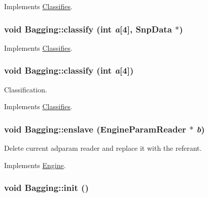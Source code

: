 Implements \hyperlink{classClassifies_a5e3d218b44024ec2c3ab3398e3dbd2e3}{Classifies}.

\hypertarget{classBagging_a9b17e15983996f8ae3b39564e7c3deba}{
\subsubsection[{classify}]{\setlength{\rightskip}{0pt plus 5cm}void Bagging::classify (int {\em a}\mbox{[}4\mbox{]}, \/  {\bf SnpData} $\ast$)}}
\label{classBagging_a9b17e15983996f8ae3b39564e7c3deba}


Implements \hyperlink{classClassifies_a7d2ae89f04af1a74eb6dd35be8eda476}{Classifies}.

\hypertarget{classBagging_a02227120bc610a21f39f2454ac03ec7b}{
\subsubsection[{classify}]{\setlength{\rightskip}{0pt plus 5cm}void Bagging::classify (int {\em a}\mbox{[}4\mbox{]})}}
\label{classBagging_a02227120bc610a21f39f2454ac03ec7b}


Classification. 



Implements \hyperlink{classClassifies_a15864d3a95edfde2bf48384c9b25c6d8}{Classifies}.

\hypertarget{classBagging_aa1f58fca264385a46fa7c14a5620488c}{
\subsubsection[{enslave}]{\setlength{\rightskip}{0pt plus 5cm}void Bagging::enslave ({\bf EngineParamReader} $\ast$ {\em b})}}
\label{classBagging_aa1f58fca264385a46fa7c14a5620488c}
Delete current adparam reader and replace it with the referant. 

Implements \hyperlink{classEngine_a023e094182312b1732fe53754c2fe5cb}{Engine}.

\hypertarget{classBagging_ab58c678f776356ae4b4c1c41dcdf3778}{
\subsubsection[{init}]{\setlength{\rightskip}{0pt plus 5cm}void Bagging::init ()}}
\label{classBagging_ab58c678f776356ae4b4c1c41dcdf3778}


